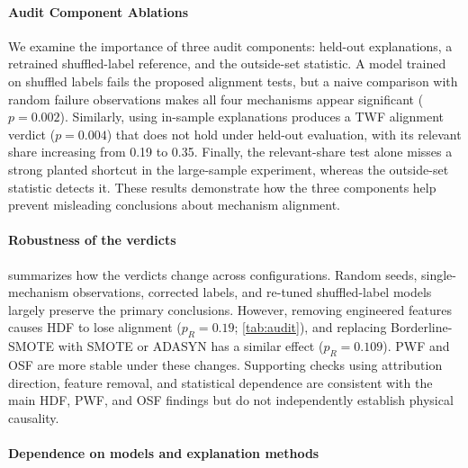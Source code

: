 \documentclass[conference]{IEEEtran}
\begin{document}
\paragraph{Audit Component Ablations}
\label{sec:naive}
\label{sec:compare}

We examine the importance of three audit components: held-out explanations, a retrained shuffled-label reference, and the outside-set statistic. A model trained on shuffled labels fails the proposed alignment tests, but a naive comparison with random failure observations makes all four mechanisms appear significant ($p=0.002$). Similarly, using in-sample explanations produces a TWF alignment verdict ($p=0.004$) that does not hold under held-out evaluation, with its relevant share increasing from 0.19 to 0.35. Finally, the relevant-share test alone misses a strong planted shortcut in the large-sample experiment, whereas the outside-set statistic detects it. These results demonstrate how the three components help prevent misleading conclusions about mechanism alignment.

\paragraph{Robustness of the verdicts}

\begin{table}[t]
\centering
\caption{Verdicts for selected audit variants: $\checkmark$ aligned, $\times$ not aligned, and \textbf{!} flagged. Full adjusted $p$-values are provided in the reproduction artifacts.}
\label{tab:robust}
\footnotesize
\setlength{\tabcolsep}{4pt}

\end{table}

 summarizes how the verdicts change across configurations. Random seeds, single-mechanism observations, corrected labels, and re-tuned shuffled-label models largely preserve the primary conclusions. However, removing engineered features causes HDF to lose alignment ($p_R=0.19$; \cref{tab:audit}), and replacing Borderline-SMOTE with SMOTE or ADASYN has a similar effect ($p_R=0.109$). PWF and OSF are more stable under these changes. Supporting checks using attribution direction, feature removal, and statistical dependence are consistent with the main HDF, PWF, and OSF findings but do not independently establish physical causality.

\paragraph{Dependence on models and explanation methods}
\label{sec:variants}
\end{document}
